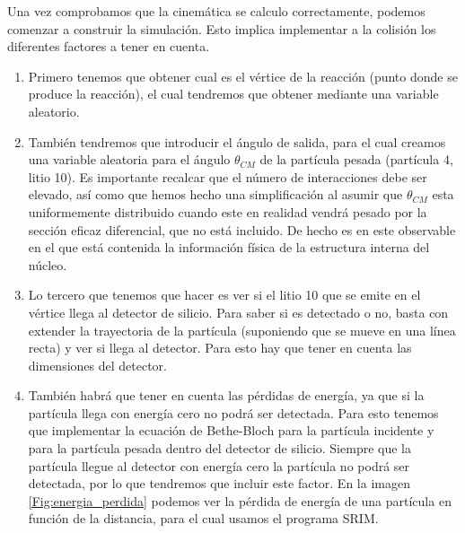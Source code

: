\documentclass[12pt,a4paper]{article}
\numberwithin{equation}{section}
\numberwithin{figure}{section}
\begin{document}
Una vez comprobamos que la cinemática se calculo correctamente, podemos comenzar a construir la simulación. Esto implica implementar a la colisión los diferentes factores a tener en cuenta. 


\begin{enumerate}

    \item  Primero tenemos que obtener cual es el vértice de la reacción (punto donde se produce la reacción), el cual tendremos que obtener mediante una variable aleatorio. 
    
    \item También tendremos que introducir el ángulo de salida, para el cual creamos una variable aleatoria para el ángulo $\theta_{CM}$ de la partícula pesada (partícula 4, litio 10). Es importante recalcar que el número de interacciones debe ser elevado, así como que hemos hecho una simplificación al asumir que $\theta_{CM}$ esta uniformemente distribuido cuando este en realidad vendrá pesado por la sección eficaz diferencial, que no está incluido. De hecho es en este observable en el que está contenida la información física de la estructura interna del núcleo. 
    
    \item Lo tercero que tenemos que hacer es ver si el litio 10 que se emite en el vértice llega al detector de silicio. Para saber si es detectado o no, basta con extender la trayectoria de la partícula (suponiendo que se mueve en una línea recta) y ver si llega al detector. Para esto hay que tener en cuenta las dimensiones del detector.     

    \item También habrá que tener en cuenta las pérdidas de energía, ya que si la partícula llega con energía cero no podrá ser detectada. Para esto tenemos que implementar la ecuación de Bethe-Bloch para la partícula incidente y para la partícula pesada dentro del detector de silicio. Siempre que la partícula llegue al detector con energía cero la partícula no podrá ser detectada, por lo que tendremos que incluir este factor. En la imagen \ref{Fig:energia_perdida} podemos ver la pérdida de energía de una partícula en función de la distancia, para el cual usamos el programa SRIM. 
    

\end{enumerate}
\end{document}
